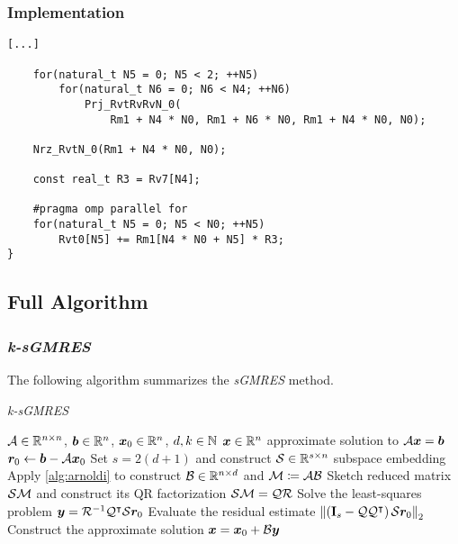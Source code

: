 \begin{frame}[fragile] %
    \frametitle{Implementation}

\begin{lstlisting}[style=cpp]
    [...]

    for(natural_t N5 = 0; N5 < 2; ++N5)
        for(natural_t N6 = 0; N6 < N4; ++N6)
            Prj_RvtRvRvN_0(
                Rm1 + N4 * N0, Rm1 + N6 * N0, Rm1 + N4 * N0, N0);

    Nrz_RvtN_0(Rm1 + N4 * N0, N0);

    const real_t R3 = Rv7[N4];

    #pragma omp parallel for
    for(natural_t N5 = 0; N5 < N0; ++N5)
        Rvt0[N5] += Rm1[N4 * N0 + N5] * R3;
}
\end{lstlisting}

\end{frame}

\subsection{Full Algorithm}

\begin{frame}[fragile]
    \frametitle{\textit{k-sGMRES}}

    The following algorithm summarizes the \textit{sGMRES} method.

    \begin{algorithm}[H]
    \caption{\textit{k-sGMRES}} \label{alg:sgmres}
    \begin{algorithmic}
    \Require $\mathcal{A} \in \mathbb{R}^{n \times n}$, $\bm{b} \in \mathbb{R}^{n}$, $\bm{x}_0 \in \mathbb{R}^{n}$, $d, k \in \mathbb{N}$
    \Ensure $\bm{x} \in \mathbb{R}^{n}$ approximate solution to $\mathcal{A} \bm{x} = \bm{b}$
    \State $\bm{r}_0 \gets \bm{b} - \mathcal{A} \bm{x}_0$
    \State Set $s = 2 (d + 1)$ and construct $\mathcal{S} \in \mathbb{R}^{s \times n}$ subspace embedding
    \State Apply \cref{alg:arnoldi} to construct $\mathcal{B} \in \mathbb{R}^{n \times d}$ and $\mathcal{M} \coloneqq \mathcal{A} \mathcal{B}$
    \State Sketch reduced matrix $\mathcal{S} \mathcal{M}$ and construct its QR factorization $\mathcal{S} \mathcal{M} = \mathcal{Q} \mathcal{R}$
    \State Solve the least-squares problem $\bm{y} = \mathcal{R}^{-1} \mathcal{Q}^{\intercal} \mathcal{S} \bm{r}_0$
    \State Evaluate the residual estimate $\left\lVert  \left( \mathbf{I}_s - \mathcal{Q} \mathcal{Q}^{\intercal} \right) \mathcal{S} \bm{r}_0  \right\rVert_2$
    \State Construct the approximate solution $\bm{x} = \bm{x}_0 + \mathcal{B} \bm{y}$
    \end{algorithmic}
    \end{algorithm}

\end{frame}
